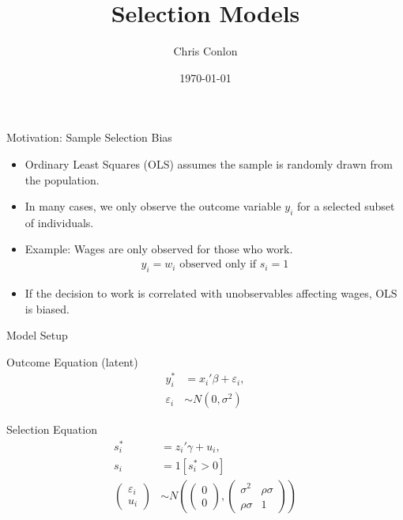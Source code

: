 \documentclass[aspectratio=169,11pt]{beamer}
\title{Selection Models}
\author{Chris Conlon}
\institute{Applied Econometrics}
\date{\today}
\begin{document}
\frame{\titlepage}


\begin{frame}{Motivation: Sample Selection Bias}
\begin{itemize}
    \item Ordinary Least Squares (OLS) assumes the sample is randomly drawn from the population.
    \item In many cases, we only observe the outcome variable $y_i$ for a selected subset of individuals.
    \item Example: Wages are only observed for those who work.
    \begin{align*}
    y_i = w_i \text{ observed only if } s_i = 1
    \end{align*}
    \item If the decision to work is correlated with unobservables affecting wages, OLS is biased.
\end{itemize}
\end{frame}

\begin{frame}{Model Setup}
\begin{block}{Outcome Equation (latent)}
\begin{align*}
y_i^* &= x_i'\beta + \varepsilon_i, \\
\varepsilon_i &\sim N(0, \sigma^2)
\end{align*}
\end{block}

\begin{block}{Selection Equation}
\begin{align*}
s_i^* &= z_i'\gamma + u_i, \\
s_i &= 1[s_i^* > 0]\\
\begin{pmatrix} \varepsilon_i \\ u_i \end{pmatrix}
&\sim N \left(
\begin{pmatrix} 0 \\ 0 \end{pmatrix},
\begin{pmatrix}
\sigma^2 & \rho\sigma \\
\rho\sigma & 1
\end{pmatrix}
\right)
\end{align*}
\end{block}
\end{frame}
\end{document}
